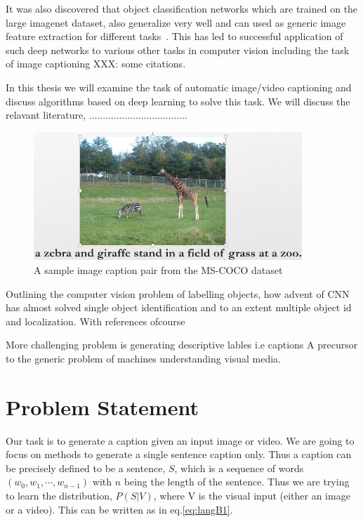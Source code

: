 It was also discovered that object classification networks which are trained on
the large imagenet dataset, also generalize very well and can used as generic
image feature extraction for different tasks~\cite{yosinski2014transferable}.
This has led to successful application of such deep networks to various other
tasks in computer vision including the task of image captioning XXX: some
citations.

In this thesis we will examine the task of automatic image/video captioning and
discuss algorithms based on deep learning to solve this task. We will discuss
the relavant literature, ....................................


\begin{figure}[h]
	\centering
	\includegraphics[width=0.9\textwidth]{./images/ExampleCaption.png}
	\caption{A sample image caption pair from the MS-COCO dataset}
	\label{fig:ExampleCap}
\end{figure}


Outlining the computer vision problem of labelling objects, how advent of CNN
has almost solved single object identification and to an extent multiple object
id and localization. With references ofcourse

More challenging problem is generating descriptive lables i.e captions
A precursor to the generic problem of machines understanding visual media. 


\section{Problem Statement}

Our task is to generate a caption given an input image or video. We are going to
focus on methods to generate a single sentence caption only. Thus a caption can
be precisely defined to be a sentence, $S$, which is a sequence of words $(w_0,
w_1,\cdots, w_{n-1})$ with $n$ being the length of the sentence. Thus we are
trying to learn the distribution, $P(S|V)$, where V is the visual input (either
an image or a video). This can be written as in eq.\ref{eq:langB1}. 

